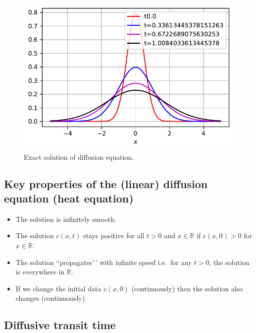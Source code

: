 \documentclass[
  letterpaper,
  DIV=11,
  numbers=noendperiod]{scrreprt}
\providecommand{\tightlist}{%
  \setlength{\itemsep}{0pt}\setlength{\parskip}{0pt}}\usepackage{longtable,booktabs,array}
\theoremstyle{plain}
\theoremstyle{definition}
\theoremstyle{plain}
\theoremstyle{remark}
\begin{document}
\begin{figure}[H]

{\centering \includegraphics{linearreactiondiffusion_files/figure-pdf/fig-diffusionpde-output-3.pdf}

}

\caption{\label{fig-diffusionpde}Exact solution of diffusion equation.}

\end{figure}

\hypertarget{key-properties-of-the-linear-diffusion-equation-heat-equation}{%
\subsection{Key properties of the (linear) diffusion equation (heat
equation)}\label{key-properties-of-the-linear-diffusion-equation-heat-equation}}

\begin{itemize}
\tightlist
\item
  The solution is infinitely smooth.
\item
  The solution \(c(x,t)\) stays positive for all \(t >0\) and
  \(x \in \mathbb R\) if \(c(x,0) >0\) for \(x \in \mathbb R\).
\item
  The solution ``propagates'\,' with infinite speed i.e.~for any
  \(t > 0\), the solution is everywhere in \(\mathbb R\).
\item
  If we change the initial data \(c(x,0)\) (continuously) then the
  solution also changes (continuously).
\end{itemize}

\hypertarget{diffusive-transit-time}{%
\subsection{Diffusive transit time}\label{diffusive-transit-time}}
\end{document}
